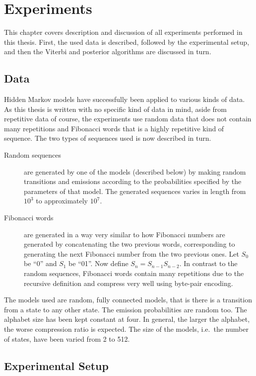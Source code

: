 \chapter{Experiments}
\label{cha:experiments}

This chapter covers description and discussion of all experiments performed in
this thesis. First, the used data is described, followed by the experimental
setup, and then the Viterbi and posterior algorithms are discussed in turn.

\section{Data}

Hidden Markov models have successfully been applied to various kinds of
data.  As this thesis is written with no specific kind of data in mind, aside
from repetitive data of course, the experiments use random data that does not
contain many repetitions and Fibonacci words that is a highly repetitive kind
of sequence.  The two types of sequences used is now described in turn.

\begin{description}
\item[Random sequences] are generated by one of the models (described below) by
  making random transitions and emissions according to the probabilities
  specified by the parameters of that model.  The generated sequences varies in
  length from $10^3$ to approximately $10^7$.
\item[Fibonacci words] are generated in a way very similar to how Fibonacci
  numbers are generated by concatenating the two previous words, corresponding
  to generating the next Fibonacci number from the two previous ones. Let $S_0$
  be ``0'' and $S_1$ be ``01''. Now define $S_n=S_{n-1}S_{n-2}$. In contrast to
  the random sequences, Fibonacci words contain many repetitions due to the
  recursive definition and compress very well using byte-pair encoding.
\end{description}

The models used are random, fully connected models, that is there is a
transition from a state to any other state. The emission probabilities are
random too. The alphabet size has been kept constant at four. In general, the
larger the alphabet, the worse compression ratio is expected. The size of the
models, i.e.\ the number of states, have been varied from 2 to 512.

\section{Experimental Setup}

